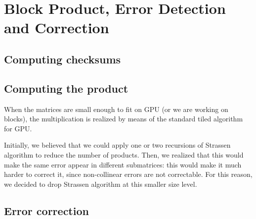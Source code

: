 \section{Block Product, Error Detection and Correction}
\label{sec:block}

\subsection{Computing checksums}
\subsection{Computing the product}

When the matrices are small enough to fit on GPU (or we are working on blocks), the multiplication is realized by means of the standard tiled algorithm for GPU.

Initially, we believed that we could apply one or two recursions of Strassen algorithm to reduce the number of products.
Then, we realized that this would make the same error appear in different submatrices: this would make it much harder to correct it, since non-collinear errors are not correctable.
For this reason, we decided to drop Strassen algorithm at this smaller size level.


\subsection{Error correction}
